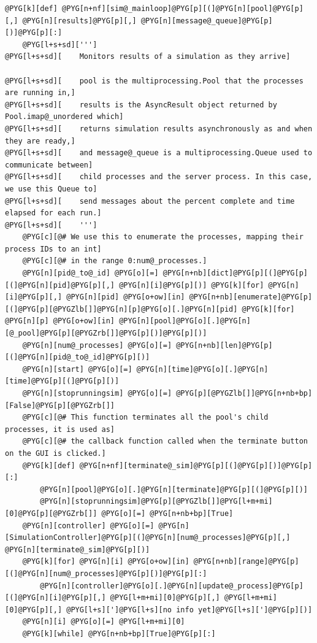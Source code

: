 \documentclass[letterpaper,10pt,english]{manual}
\begin{document}
\begin{Verbatim}[commandchars=@\[\]]
@PYG[k][def] @PYG[n+nf][sim@_mainloop]@PYG[p][(]@PYG[n][pool]@PYG[p][,] @PYG[n][results]@PYG[p][,] @PYG[n][message@_queue]@PYG[p][)]@PYG[p][:]
    @PYG[l+s+sd][''']
@PYG[l+s+sd][    Monitors results of a simulation as they arrive]

@PYG[l+s+sd][    pool is the multiprocessing.Pool that the processes are running in,]
@PYG[l+s+sd][    results is the AsyncResult object returned by Pool.imap@_unordered which]
@PYG[l+s+sd][    returns simulation results asynchronously as and when they are ready,]
@PYG[l+s+sd][    and message@_queue is a multiprocessing.Queue used to communicate between]
@PYG[l+s+sd][    child processes and the server process. In this case, we use this Queue to]
@PYG[l+s+sd][    send messages about the percent complete and time elapsed for each run.]
@PYG[l+s+sd][    ''']
    @PYG[c][@# We use this to enumerate the processes, mapping their process IDs to an int]
    @PYG[c][@# in the range 0:num@_processes.]
    @PYG[n][pid@_to@_id] @PYG[o][=] @PYG[n+nb][dict]@PYG[p][(]@PYG[p][(]@PYG[n][pid]@PYG[p][,] @PYG[n][i]@PYG[p][)] @PYG[k][for] @PYG[n][i]@PYG[p][,] @PYG[n][pid] @PYG[o+ow][in] @PYG[n+nb][enumerate]@PYG[p][(]@PYG[p][@PYGZlb[]]@PYG[n][p]@PYG[o][.]@PYG[n][pid] @PYG[k][for] @PYG[n][p] @PYG[o+ow][in] @PYG[n][pool]@PYG[o][.]@PYG[n][@_pool]@PYG[p][@PYGZrb[]]@PYG[p][)]@PYG[p][)]
    @PYG[n][num@_processes] @PYG[o][=] @PYG[n+nb][len]@PYG[p][(]@PYG[n][pid@_to@_id]@PYG[p][)]
    @PYG[n][start] @PYG[o][=] @PYG[n][time]@PYG[o][.]@PYG[n][time]@PYG[p][(]@PYG[p][)]
    @PYG[n][stoprunningsim] @PYG[o][=] @PYG[p][@PYGZlb[]]@PYG[n+nb+bp][False]@PYG[p][@PYGZrb[]]
    @PYG[c][@# This function terminates all the pool's child processes, it is used as]
    @PYG[c][@# the callback function called when the terminate button on the GUI is clicked.]
    @PYG[k][def] @PYG[n+nf][terminate@_sim]@PYG[p][(]@PYG[p][)]@PYG[p][:]
        @PYG[n][pool]@PYG[o][.]@PYG[n][terminate]@PYG[p][(]@PYG[p][)]
        @PYG[n][stoprunningsim]@PYG[p][@PYGZlb[]]@PYG[l+m+mi][0]@PYG[p][@PYGZrb[]] @PYG[o][=] @PYG[n+nb+bp][True]
    @PYG[n][controller] @PYG[o][=] @PYG[n][SimulationController]@PYG[p][(]@PYG[n][num@_processes]@PYG[p][,] @PYG[n][terminate@_sim]@PYG[p][)]
    @PYG[k][for] @PYG[n][i] @PYG[o+ow][in] @PYG[n+nb][range]@PYG[p][(]@PYG[n][num@_processes]@PYG[p][)]@PYG[p][:]
        @PYG[n][controller]@PYG[o][.]@PYG[n][update@_process]@PYG[p][(]@PYG[n][i]@PYG[p][,] @PYG[l+m+mi][0]@PYG[p][,] @PYG[l+m+mi][0]@PYG[p][,] @PYG[l+s][']@PYG[l+s][no info yet]@PYG[l+s][']@PYG[p][)]
    @PYG[n][i] @PYG[o][=] @PYG[l+m+mi][0]
    @PYG[k][while] @PYG[n+nb+bp][True]@PYG[p][:]

\end{Verbatim}
\end{document}
